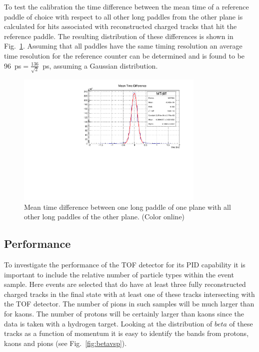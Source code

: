 To test the calibration the time difference between the mean time of a reference paddle of choice with respect to 
all other long paddles from the other plane is calculated for hits associated with reconstructed charged tracks that hit
the reference paddle. The resulting distribution of these differences is shown in Fig.~\ref{fig:mt_diff}. Assuming that
all paddles have the same timing resolution an average time resolution for the reference counter can be determined 
and is found to be  96~ps$=\frac{136}{\sqrt{2}}$~ps, assuming a Gaussian distribution.
\begin{figure}[tbp]
\begin{center}
\includegraphics[width=0.8\textwidth]{figures/mt_diff_fullTOF.pdf}
\caption{\label{fig:mt_diff} Mean time difference between one long paddle of one plane with all other long paddles
of the other plane. (Color online)}
\end{center}
\end{figure}
\subsection{Performance \label{sec:scperformance}}
To investigate the performance of the TOF detector for its PID capability it is important to include the relative number of
particle types within the event sample. Here events are selected that do have at least three fully reconstructed charged tracks in the final state with at least one of these tracks intersecting with the TOF detector. The number of pions in such samples will
be much larger than for kaons. The number of protons will be certainly larger than kaons since the data is taken with a hydrogen 
target. Looking at the distribution of $beta$ of these tracks as a function of momentum it is easy to identify the bands
from protons, kaons and pions (see Fig.~\ref{fig:betavsp}). 

